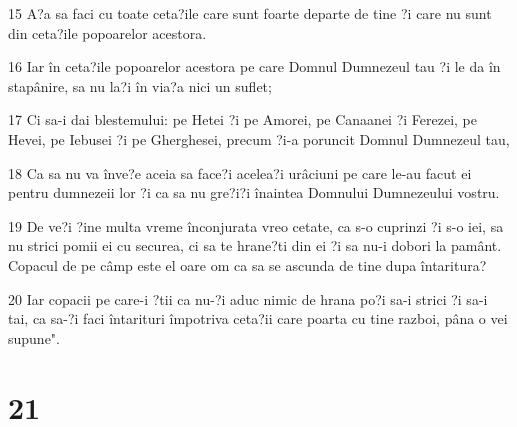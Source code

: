 \par 15 A?a sa faci cu toate ceta?ile care sunt foarte departe de tine ?i care nu sunt din ceta?ile popoarelor acestora.
\par 16 Iar în ceta?ile popoarelor acestora pe care Domnul Dumnezeul tau ?i le da în stapânire, sa nu la?i în via?a nici un suflet;
\par 17 Ci sa-i dai blestemului: pe Hetei ?i pe Amorei, pe Canaanei ?i Ferezei, pe Hevei, pe Iebusei ?i pe Gherghesei, precum ?i-a poruncit Domnul Dumnezeul tau,
\par 18 Ca sa nu va înve?e aceia sa face?i acelea?i urâciuni pe care le-au facut ei pentru dumnezeii lor ?i ca sa nu gre?i?i înaintea Domnului Dumnezeului vostru.
\par 19 De ve?i ?ine multa vreme înconjurata vreo cetate, ca s-o cuprinzi ?i s-o iei, sa nu strici pomii ei cu securea, ci sa te hrane?ti din ei ?i sa nu-i dobori la pamânt. Copacul de pe câmp este el oare om ca sa se ascunda de tine dupa întaritura?
\par 20 Iar copacii pe care-i ?tii ca nu-?i aduc nimic de hrana po?i sa-i strici ?i sa-i tai, ca sa-?i faci întarituri împotriva ceta?ii care poarta cu tine razboi, pâna o vei supune".

\chapter{21}

